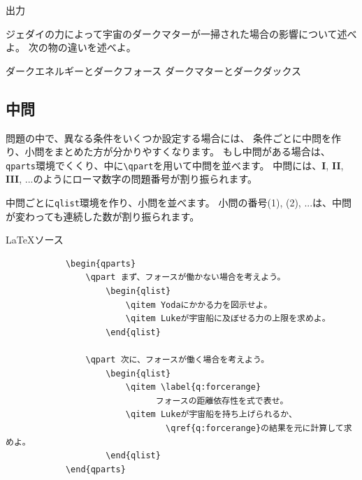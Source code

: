 \documentclass[dvipdfmx,a4j,11pt]{jarticle}
\newenvironment{inputbox}{%
	\begin{itembox}[r]{\LaTeX ソース}
}{
	\end{itembox}
}
\newenvironment{outputbox}{%
	\begin{itembox}[r]{出力}
}{%
	\end{itembox}
}
\begin{document}
	\begin{outputbox}
			\begin{qlist}
			    \qitem ジェダイの力によって宇宙のダークマターが一掃された場合の影響について述べよ。
			    \qitem 次の物の違いを述べよ。
			        \begin{qlist2}
			            \qitem ダークエネルギーとダークフォース
			            \qitem ダークマターとダークダックス
			        \end{qlist2}
			        
			\end{qlist}
	\end{outputbox}
	
\subsection{中問}
	問題の中で、異なる条件をいくつか設定する場合には、
	条件ごとに中問を作り、小問をまとめた方が分かりやすくなります。
	もし中問がある場合は、{\tt qparts}環境でくくり、中に{\tt \textbackslash qpart}を用いて中問を並べます。
	中問には、{\bf I}, {\bf II}, {\bf III}, ...のようにローマ数字の問題番号が割り振られます。
	
	中問ごとに{\tt qlist}環境を作り、小問を並べます。
	小問の番号(1), (2), ...は、中問が変わっても連続した数が割り振られます。
	
	\begin{inputbox}
		\begin{verbatim}
			\begin{qparts}
			    \qpart まず、フォースが働かない場合を考えよう。
			        \begin{qlist}
			            \qitem Yodaにかかる力を図示せよ。
			            \qitem Lukeが宇宙船に及ぼせる力の上限を求めよ。
			        \end{qlist}
			        
			    \qpart 次に、フォースが働く場合を考えよう。
			        \begin{qlist}
			            \qitem \label{q:forcerange}
			                  フォースの距離依存性を式で表せ。
			            \qitem Lukeが宇宙船を持ち上げられるか、
			                    \qref{q:forcerange}の結果を元に計算して求めよ。
			        \end{qlist}
			\end{qparts}
		\end{verbatim}
	\end{inputbox}
	
	\setcounter{qpartNumber}{0}	%
	\setcounter{enumqSave}{0}
	
\end{document}
